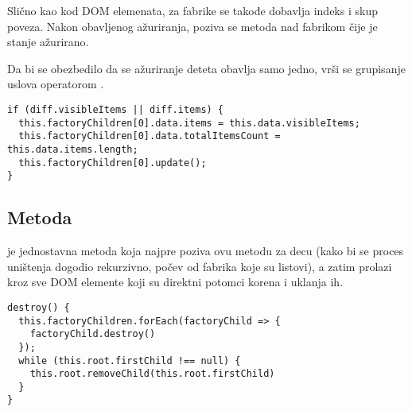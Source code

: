 Slično kao kod DOM elemenata, za fabrike se takođe dobavlja indeks i skup poveza.
Nakon obavljenog ažuriranja, poziva se metoda  nad fabrikom čije je stanje ažurirano.

Da bi se obezbedilo da se ažuriranje deteta obavlja samo jedno, vrši se grupisanje uslova operatorom \code{||}.

\begin{lstlisting}
if (diff.visibleItems || diff.items) {
  this.factoryChildren[0].data.items = this.data.visibleItems;
  this.factoryChildren[0].data.totalItemsCount = this.data.items.length;
  this.factoryChildren[0].update();
}
\end{lstlisting}

\subsection{Metoda }
\label{subsec:metoda-destroy}

 je jednostavna metoda koja najpre poziva ovu metodu za decu (kako bi se proces uništenja dogodio rekurzivno, počev od fabrika koje su listovi), a zatim prolazi kroz sve DOM elemente koji su direktni potomci korena i uklanja ih.

\begin{lstlisting}
destroy() {
  this.factoryChildren.forEach(factoryChild => {
    factoryChild.destroy()
  });
  while (this.root.firstChild !== null) {
    this.root.removeChild(this.root.firstChild)
  }
}
\end{lstlisting}
